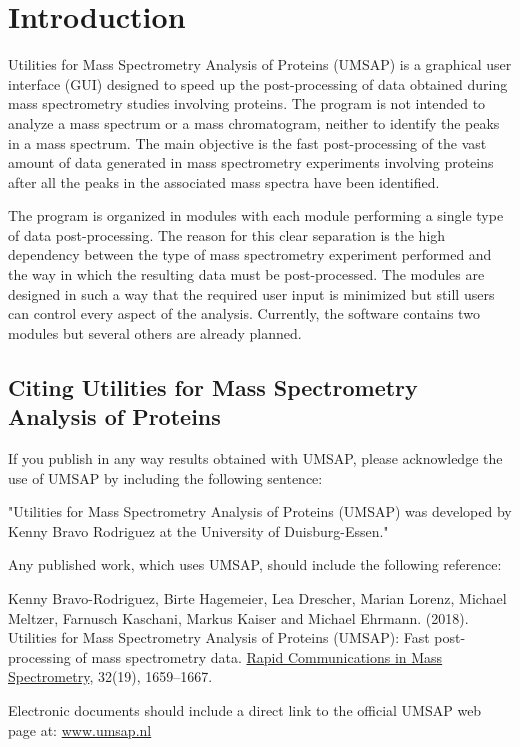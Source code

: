 \chapter{Introduction}

Utilities for Mass Spectrometry Analysis of Proteins (UMSAP) is a graphical user interface (GUI) designed to speed up the post-processing of data obtained during mass spectrometry studies involving proteins. The program is not intended to analyze a mass spectrum or a mass chromatogram, neither to identify the peaks in a mass spectrum. The main objective is the fast post-processing of the vast amount of data generated in mass spectrometry experiments involving proteins after all the peaks in the associated mass spectra have been identified.

The program is organized in modules with each module performing a single type of data post-processing. The reason for this clear separation is the high dependency between the type of mass spectrometry experiment performed and the way in which the resulting data must be post-processed. The modules are designed in such a way that the required user input is minimized but still users can control every aspect of the analysis. Currently, the software contains two modules but several others are already planned. 

\section{Citing Utilities for Mass Spectrometry Analysis of Proteins}

If you publish in any way results obtained with UMSAP, please acknowledge the use of UMSAP by including the following sentence:

"Utilities for Mass Spectrometry Analysis of Proteins (UMSAP) was developed by Kenny Bravo Rodriguez at the University of Duisburg-Essen."

Any published work, which uses UMSAP, should include the following reference:

Kenny Bravo-Rodriguez, Birte Hagemeier, Lea Drescher, Marian Lorenz, Michael Meltzer, Farnusch Kaschani, Markus Kaiser and Michael Ehrmann. (\num{2018}). Utilities for Mass Spectrometry Analysis of Proteins (UMSAP): Fast post-processing of mass spectrometry data. \href{https://onlinelibrary.wiley.com/doi/10.1002/rcm.8243}{Rapid Communications in Mass Spectrometry}, \num{32}(\num{19}), \numrange[range-phrase = --]{1659}{1667}.

Electronic documents should include a direct link to the official UMSAP web page at:\newline
\href{https://www.umsap.nl}{www.umsap.nl}

